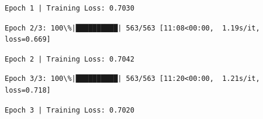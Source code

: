 \documentclass[11pt]{article}
\begin{document}
    \begin{Verbatim}[commandchars=\\\{\}]
Epoch 1 | Training Loss: 0.7030
    \end{Verbatim}

    \begin{Verbatim}[commandchars=\\\{\}]
Epoch 2/3: 100\%|██████████| 563/563 [11:08<00:00,  1.19s/it, loss=0.669]
    \end{Verbatim}

    \begin{Verbatim}[commandchars=\\\{\}]
Epoch 2 | Training Loss: 0.7042
    \end{Verbatim}

    \begin{Verbatim}[commandchars=\\\{\}]
Epoch 3/3: 100\%|██████████| 563/563 [11:20<00:00,  1.21s/it, loss=0.718]
    \end{Verbatim}

    \begin{Verbatim}[commandchars=\\\{\}]
Epoch 3 | Training Loss: 0.7020
    \end{Verbatim}

    \begin{Verbatim}[commandchars=\\\{\}]

    \end{Verbatim}
\end{document}
